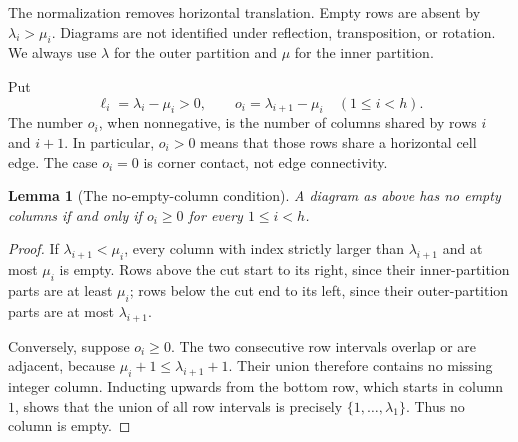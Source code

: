 \documentclass[11pt,letterpaper]{article}
\numberwithin{equation}{section}
\newtheorem{lemma}[theorem]{Lemma}
\theoremstyle{definition}
\begin{document}
The normalization removes horizontal translation. Empty rows are absent by
$\lambda_i>\mu_i$. Diagrams are not identified under reflection,
transposition, or rotation. We always use $\lambda$ for the outer partition
and $\mu$ for the inner partition.

Put
\begin{equation}
 \ell_i=\lambda_i-\mu_i>0,\qquad
 o_i=\lambda_{i+1}-\mu_i\quad(1\le i<h).
 \label{eq:lengthoverlap}
\end{equation}
The number $o_i$, when nonnegative, is the number of columns shared by rows
$i$ and $i+1$. In particular, $o_i>0$ means that those rows share a horizontal
cell edge. The case $o_i=0$ is corner contact, not edge connectivity.

\begin{lemma}[The no-empty-column condition]
\label{lem:noempty}
A diagram as above has no empty columns if and only if $o_i\ge0$ for every
$1\le i<h$.
\end{lemma}
\begin{proof}
If $\lambda_{i+1}<\mu_i$, every column with index strictly larger than
$\lambda_{i+1}$ and at most $\mu_i$ is empty. Rows above the cut start to its
right, since their inner-partition parts are at least $\mu_i$; rows below
the cut end to its left, since their outer-partition parts are at most
$\lambda_{i+1}$.

Conversely, suppose $o_i\ge0$. The two consecutive row intervals overlap or
are adjacent, because
$\mu_i+1\le\lambda_{i+1}+1$. Their union therefore contains no missing
integer column. Inducting upwards from the bottom row, which starts in
column $1$, shows that the union of all row intervals is precisely
$\{1,\ldots,\lambda_1\}$. Thus no column is empty.
\end{proof}
\end{document}
